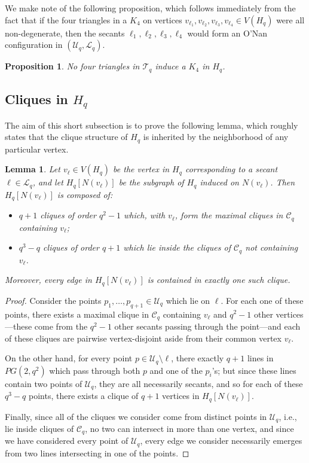 \documentclass[A4paper,reqno,oneside,12pt]{amsart}
\theoremstyle{plain}
\newtheorem{lemma}[theorem]{Lemma}
\newtheorem{proposition}[theorem]{Proposition}
\theoremstyle{definition}
\newcommand{\scC}{\mathscr{C}}
\newcommand{\scL}{\mathscr{L}}
\newcommand{\scT}{\mathscr{T}}
\newcommand{\scU}{\mathscr{U}}
\def\l{\ell}
\begin{document}
We make note of the following proposition, which follows immediately from the fact that if the four triangles in a $K_4$ on vertices $v_{\l_1}, v_{\l_2}, v_{\l_3}, v_{\l_4} \in V(H_q)$ were all non-degenerate, then the secants $\l_1, \l_2, \l_3, \l_4$ would form an O'Nan configuration in $(\scU_q, \scL_q)$.

\begin{proposition}
\label{prp: non-degenerate triangles}
    No four triangles in $\scT_q$ induce a $K_4$ in $H_q$.
\end{proposition}

\subsection{Cliques in $H_q$}

The aim of this short subsection is to prove the following lemma, which roughly states that the clique structure of $H_q$ is inherited by the neighborhood of any particular vertex.

\begin{lemma}
\label{lem: nbhd}
    Let $v_\l \in V(H_q)$ be the vertex in $H_q$ corresponding to a secant $\l \in \scL_q$, and let $H_q[N(v_\l)]$ be the subgraph of $H_q$ induced on $N(v_\l)$.
    Then $H_q[N(v_\l)]$ is composed of:
    \begin{itemize}
        \item $q+1$ cliques of order $q^2-1$ which, with $v_\l$, form the maximal cliques in $\scC_q$ containing $v_\l$;
        \item $q^3-q$ cliques of order $q+1$ which lie inside the cliques of $\scC_q$ not containing $v_\l$.
    \end{itemize}
    Moreover, every edge in $H_q[N(v_\l)]$ is contained in exactly one such clique.
\end{lemma}

\begin{proof}
    Consider the points $p_1, \dots, p_{q+1} \in \scU_q$ which lie on $\l$.
    For each one of these points, there exists a maximal clique in $\scC_q$ containing $v_\l$ and $q^2-1$ other vertices---these come from the $q^2-1$ other secants passing through the point---and each of these cliques are pairwise vertex-disjoint aside from their common vertex $v_\l$.

    On the other hand, for every point $p \in \scU_q \setminus \l$, there exactly $q+1$ lines in $PG(2,q^2)$ which pass through both $p$ and one of the $p_i$'s; but since these lines contain two points of $\scU_q$, they are all necessarily secants, and so for each of these $q^3-q$ points, there exists a clique of $q+1$ vertices in $H_q[N(v_\l)]$.

    Finally, since all of the cliques we consider come from distinct points in $\scU_q$, i.e., lie inside cliques of $\scC_q$, no two can intersect in more than one vertex, and since we have considered every point of $\scU_q$, every edge we consider necessarily emerges from two lines intersecting in one of the points.
\end{proof}
\end{document}
